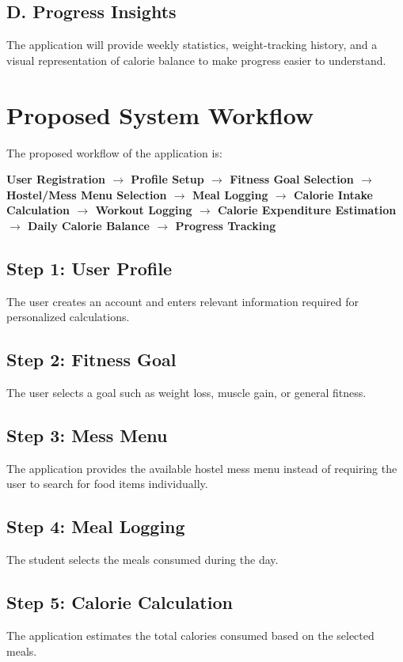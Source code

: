 \documentclass[11pt,a4paper]{article}
\begin{document}
\subsection*{D. Progress Insights}
The application will provide weekly statistics, weight-tracking history, and a visual representation of calorie balance to make progress easier to understand.

\section{Proposed System Workflow}

The proposed workflow of the application is:

\begin{center}
\textbf{User Registration $\rightarrow$ Profile Setup $\rightarrow$ Fitness Goal Selection $\rightarrow$ Hostel/Mess Menu Selection $\rightarrow$ Meal Logging $\rightarrow$ Calorie Intake Calculation $\rightarrow$ Workout Logging $\rightarrow$ Calorie Expenditure Estimation $\rightarrow$ Daily Calorie Balance $\rightarrow$ Progress Tracking}
\end{center}

\subsection*{Step 1: User Profile}
The user creates an account and enters relevant information required for personalized calculations.

\subsection*{Step 2: Fitness Goal}
The user selects a goal such as weight loss, muscle gain, or general fitness.

\subsection*{Step 3: Mess Menu}
The application provides the available hostel mess menu instead of requiring the user to search for food items individually.

\subsection*{Step 4: Meal Logging}
The student selects the meals consumed during the day.

\subsection*{Step 5: Calorie Calculation}
The application estimates the total calories consumed based on the selected meals.
\end{document}
